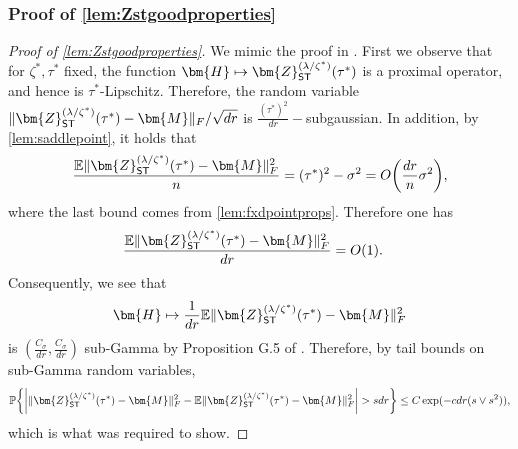 \documentclass[10pt]{article}
\newcommand{\s}{^*}
\newcommand{\p}{\mathbb{P}}
\theoremstyle{definition}
\begin{document}
\subsubsection{Proof of \cref{lem:Zstgoodproperties}}
\label{sec:Zstgoodproperties_proof}
\begin{proof}[Proof of \cref{lem:Zstgoodproperties}]
We mimic the proof in \citet{celentano_lasso_2023}.  
First we observe that for $\zeta\s,\tau\s$ fixed, the function $\bm{H} \mapsto \bm{Z}_{{\sf ST}}^{(\lambda/\zeta\s)}(\tau\s)$ is a proximal operator, and hence is $\tau\s$-Lipschitz.  Therefore, the random variable $\|\bm{Z}_{{\sf ST}}^{(\lambda/\zeta\s)}(\tau\s) - \bm{M} \|_F/\sqrt{dr}$ is $\frac{(\tau\s)^2}{dr}-$subgaussian.  In addition, by \cref{lem:saddlepoint}, it holds that 
\begin{align}
    \frac{\mathbb{E} \| \bm{Z}_{{\sf ST}}^{(\lambda/\zeta\s)}(\tau\s) - \bm{M} \|_F^2}{n} = (\tau\s)^2 - \sigma^2 = O\bigg( \frac{dr}{n} \sigma^2 \bigg),
\end{align}
where the last bound comes from \cref{lem:fxdpointprops}.  Therefore one has
\begin{align}
      \frac{\mathbb{E} \| \bm{Z}_{{\sf ST}}^{(\lambda/\zeta\s)}(\tau\s) - \bm{M} \|_F^2}{dr} &= O(1).
\end{align}
Consequently, we see that
\begin{align}
    \bm{H} \mapsto \frac{1}{dr} \mathbb{E} \| \bm{Z}_{{\sf ST}}^{(\lambda/\zeta\s)}(\tau\s) - \bm{M} \|_F^2
\end{align}
is $(\frac{C_\sigma}{dr},\frac{C_\sigma}{dr})$ sub-Gamma by Proposition G.5 of \citet{miolane_distribution_2021}.  Therefore, by tail bounds on sub-Gamma random variables,
     \begin{align}
\p\bigg\{      \bigg|  \| \bm{ Z}_{{\sf ST}}^{(\lambda/\zeta\s)}(\tau\s) - \bm{M} \|_F^2 - \mathbb{E} \|\bm{ Z}_{{\sf ST}}^{(\lambda/\zeta\s)}(\tau\s) - \bm{M} \|_F^2 \bigg|  > s d r \bigg\} \leq C \exp(- c dr (s \vee s^2) ),
    \end{align}
    which is what was required to show.     


\end{proof}
\end{document}
